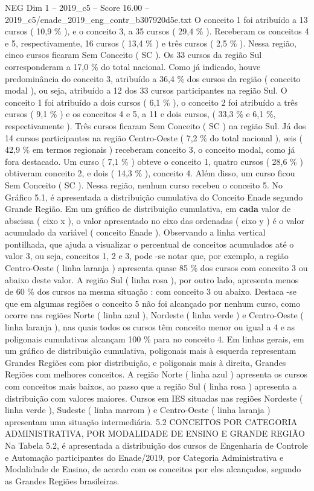 \begin{textsample}{NEG Dim 1 – 2019\_c5 – Score 16.00 – 2019\_c5/enade\_2019\_eng\_contr\_b307920d5e.txt}
O conceito 1 foi atribuído a 13 cursos ( 10,9 \% ), e o conceito 3, a 35 cursos ( 29,4 \% ).
Receberam os conceitos 4 e 5, respectivamente, 16 cursos ( 13,4 \% ) e três cursos ( 2,5 \% ).
Nessa região, cinco cursos ficaram Sem Conceito ( SC ).
Os 33 cursos da região Sul corresponderam a 17,0 \% do total nacional.
Como já indicado, houve predominância do conceito 3, atribuído a 36,4 \% dos cursos da região ( conceito modal ), ou seja, atribuído a 12 dos 33 cursos participantes na região Sul.
O conceito 1 foi atribuído a dois cursos ( 6,1 \% ), o conceito 2 foi atribuído a três cursos ( 9,1 \% ) e os conceitos 4 e 5, a 11 e dois cursos, ( 33,3 \% e 6,1 \%, respectivamente ).
Três cursos ficaram Sem Conceito ( SC ) na região Sul.
Já dos 14 cursos participantes na região Centro-Oeste ( 7,2 \% do total nacional ), seis ( 42,9 \% em termos regionais ) receberam conceito 3, o conceito modal, como já fora destacado.
Um curso ( 7,1 \% ) obteve o conceito 1, quatro cursos ( 28,6 \% ) obtiveram conceito 2, e dois ( 14,3 \% ), conceito 4.
Além disso, um curso ficou Sem Conceito ( SC ).
Nessa região, nenhum curso recebeu o conceito 5.
No Gráfico 5.1, é apresentada a distribuição cumulativa do Conceito Enade segundo Grande Região.
Em um gráfico de distribuição cumulativa, em \textbf{cada} valor de abscissa ( eixo x ), o valor apresentado no eixo das ordenadas ( eixo y ) é o valor acumulado da variável ( conceito Enade ).
Observando a linha vertical pontilhada, que ajuda a visualizar o percentual de conceitos acumulados até o valor 3, ou seja, conceitos 1, 2 e 3, pode -se notar que, por exemplo, a região Centro-Oeste ( linha laranja ) apresenta quase 85 \% dos cursos com conceito 3 ou abaixo deste valor.
A região Sul ( linha rosa ), por outro lado, apresenta menos de 60 \% dos cursos na mesma situação : com conceito 3 ou abaixo.
Destaca -se que em algumas regiões o conceito 5 não foi alcançado por nenhum curso, como ocorre nas regiões Norte ( linha azul ), Nordeste ( linha verde ) e Centro-Oeste ( linha laranja ), nas quais todos os cursos têm conceito menor ou igual a 4 e as poligonais cumulativas alcançam 100 \% para no conceito 4.
Em linhas gerais, em um gráfico de distribuição cumulativa, poligonais mais à esquerda representam Grandes Regiões com pior distribuição, e poligonais mais à direita, Grandes Regiões com melhores conceitos.
A região Norte ( linha azul ) apresenta os cursos com conceitos mais baixos, ao passo que a região Sul ( linha rosa ) apresenta a distribuição com valores maiores.
Cursos em IES situadas nas regiões Nordeste ( linha verde ), Sudeste ( linha marrom ) e Centro-Oeste ( linha laranja ) apresentam uma situação intermediária. 5.2 CONCEITOS POR CATEGORIA ADMINISTRATIVA, POR MODALIDADE DE ENSINO E GRANDE REGIÃO Na Tabela 5.2, é apresentada a distribuição dos cursos de Engenharia de Controle e Automação participantes do Enade/2019, por Categoria Administrativa e Modalidade de Ensino, de acordo com os conceitos por eles alcançados, segundo as Grandes Regiões brasileiras.

\end{textsample}
